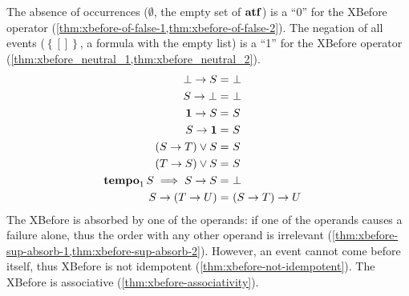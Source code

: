 The absence of occurrences ($\emptyset$, the empty set of $\mathbf{atf}$) is a ``0'' for the \ac{XBefore} operator (\cref{thm:xbefore-of-false-1,thm:xbefore-of-false-2}).
The negation of all events ($\left\{\left[\right]\right\}$, a formula with the empty list) is a ``1'' for the \ac{XBefore} operator (\cref{thm:xbefore_neutral_1,thm:xbefore_neutral_2}).
%
\begin{subequations}
\begin{align}
\xbefore{\bot}{S} =&~
  \bot &
  \label{thm:xbefore-of-false-1}\\
%
\xbefore{S}{\bot} =&~
  \bot &
  \label{thm:xbefore-of-false-2}\\
%
\xbefore{\neutral}{S} =&~
  S &
  \label{thm:xbefore_neutral_1}\\
%
\xbefore{S}{\neutral} =&~
  S &
  \label{thm:xbefore_neutral_2}\\
%
\left(\xbefore{S}{T}\right) \lor S =&~ S &
  \label{thm:xbefore-sup-absorb-1}\\
%
\left(\xbefore{T}{S}\right) \lor S =&~ S &
  \label{thm:xbefore-sup-absorb-2}\\
%
\tempo[1]{S} \implies
  \xbefore{S}{S} =&~
  \bot &
  \label{thm:xbefore-not-idempotent}\\
%
\xbefore{S}{(\xbefore{T}{U})} =&~
  \xbefore{(\xbefore{S}{T})}{U} &
  \label{thm:xbefore-associativity}
%
\end{align}
\end{subequations}
%
The \ac{XBefore} is absorbed by one of the operands: if one of the operands causes a failure alone, thus the order with any other operand is irrelevant (\cref{thm:xbefore-sup-absorb-1,thm:xbefore-sup-absorb-2}).
However, an event cannot come before itself, thus \ac{XBefore} is not idempotent (\cref{thm:xbefore-not-idempotent}).
The \ac{XBefore} is associative (\cref{thm:xbefore-associativity}).

